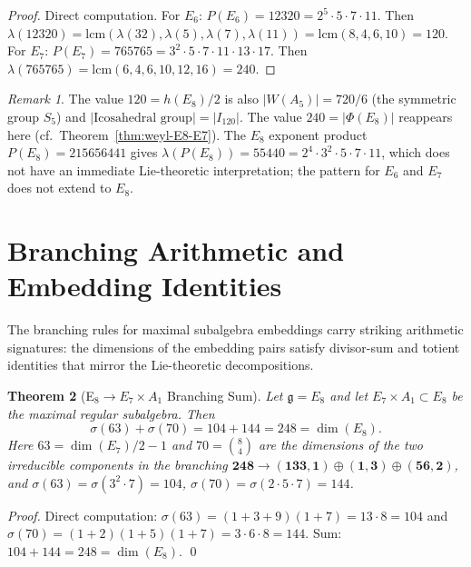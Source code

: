 \documentclass[11pt]{amsart}
\theoremstyle{plain}
\newtheorem{theorem}{Theorem}[section]
\theoremstyle{definition}
\theoremstyle{remark}
\newtheorem{remark}[theorem]{Remark}
\newcommand{\fg}{\mathfrak{g}}
\renewcommand{\Phi}{\varPhi}
\begin{document}
\begin{proof}
  Direct computation.  For $E_6$: $P(E_6) = 12320 = 2^5\cdot 5\cdot 7\cdot 11$.
  Then $\lambda(12320) = \mathrm{lcm}(\lambda(32), \lambda(5), \lambda(7), \lambda(11))
  = \mathrm{lcm}(8, 4, 6, 10) = 120$.
  For $E_7$: $P(E_7) = 765765 = 3^2\cdot 5\cdot 7\cdot 11\cdot 13\cdot 17$.
  Then $\lambda(765765) = \mathrm{lcm}(6, 4, 6, 10, 12, 16) = 240$.
\end{proof}

\begin{remark}
  The value $120 = h(E_8)/2$ is also $|W(A_5)| = 720/6$ (the symmetric
  group $S_5$) and $|\text{Icosahedral group}| = |I_{120}|$.
  The value $240 = |\Phi(E_8)|$ reappears here (cf.\ Theorem~\ref{thm:weyl-E8-E7}).
  The $E_8$ exponent product $P(E_8) = 215656441$ gives
  $\lambda(P(E_8)) = 55440 = 2^4\cdot 3^2\cdot 5\cdot 7\cdot 11$,
  which does not have an immediate Lie-theoretic interpretation;
  the pattern for $E_6$ and $E_7$ does not extend to $E_8$.
\end{remark}

\section{Branching Arithmetic and Embedding Identities}\label{sec:branching}

The branching rules for maximal subalgebra embeddings carry striking
arithmetic signatures: the dimensions of the embedding pairs satisfy
divisor-sum and totient identities that mirror the Lie-theoretic
decompositions.

\begin{theorem}[E$_8 \to E_7 \times A_1$ Branching Sum]\label{thm:e8-e7a1-branch}
Let $\fg = E_8$ and let $E_7 \times A_1 \subset E_8$ be the maximal
regular subalgebra.  Then
\[
  \sigma(63) + \sigma(70) = 104 + 144 = 248 = \dim(E_8).
\]
Here $63 = \dim(E_7)/2 - 1$ and $70 = \binom{8}{4}$ are the dimensions
of the two irreducible components in the branching $\mathbf{248} \to
(\mathbf{133}, \mathbf{1}) \oplus (\mathbf{1}, \mathbf{3}) \oplus
(\mathbf{56}, \mathbf{2})$, and $\sigma(63) = \sigma(3^2 \cdot 7) = 104$,
$\sigma(70) = \sigma(2 \cdot 5 \cdot 7) = 144$.
\end{theorem}

\begin{proof}
Direct computation: $\sigma(63) = (1+3+9)(1+7) = 13 \cdot 8 = 104$ and
$\sigma(70) = (1+2)(1+5)(1+7) = 3 \cdot 6 \cdot 8 = 144$.
Sum: $104 + 144 = 248 = \dim(E_8)$. \qed
\end{proof}
\end{document}
